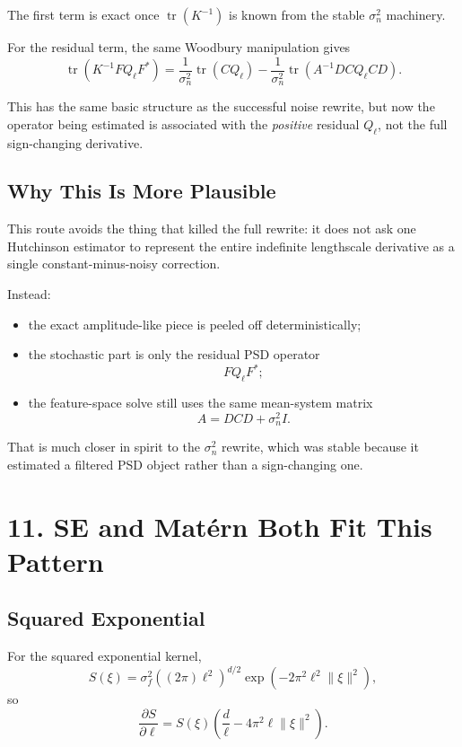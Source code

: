 \documentclass[11pt]{article}
\begin{document}
The first term is exact once $\operatorname{tr}(K^{-1})$ is known from the
stable $\sigma_n^2$ machinery.

For the residual term, the same Woodbury manipulation gives
\begin{equation}
\operatorname{tr}\!\left(K^{-1} F Q_\ell F^\ast\right)
=
\frac{1}{\sigma_n^2}\operatorname{tr}(C Q_\ell)
-
\frac{1}{\sigma_n^2}
\operatorname{tr}\!\left(A^{-1} D C Q_\ell C D\right).
\end{equation}

This has the same basic structure as the successful noise rewrite, but now the
operator being estimated is associated with the \emph{positive} residual
$Q_\ell$, not the full sign-changing derivative.

\subsection*{Why This Is More Plausible}

This route avoids the thing that killed the full rewrite: it does not ask one
Hutchinson estimator to represent the entire indefinite lengthscale derivative
as a single constant-minus-noisy correction.

Instead:
\begin{itemize}
  \item the exact amplitude-like piece is peeled off deterministically;
  \item the stochastic part is only the residual PSD operator
  \[
    F Q_\ell F^\ast;
  \]
  \item the feature-space solve still uses the same mean-system matrix
  \[
    A = D C D + \sigma_n^2 I.
  \]
\end{itemize}

That is much closer in spirit to the $\sigma_n^2$ rewrite, which was stable
because it estimated a filtered PSD object rather than a sign-changing one.

\section*{11. SE and Mat\'ern Both Fit This Pattern}

\subsection*{Squared Exponential}

For the squared exponential kernel,
\begin{equation}
S(\xi)
=
\sigma_f^2
\left((2\pi)\ell^2\right)^{d/2}
\exp\!\left(-2\pi^2 \ell^2 \|\xi\|^2\right),
\end{equation}
so
\begin{equation}
\frac{\partial S}{\partial \ell}
=
S(\xi)
\left(
\frac{d}{\ell}
- 4\pi^2 \ell \|\xi\|^2
\right).
\end{equation}
\end{document}
